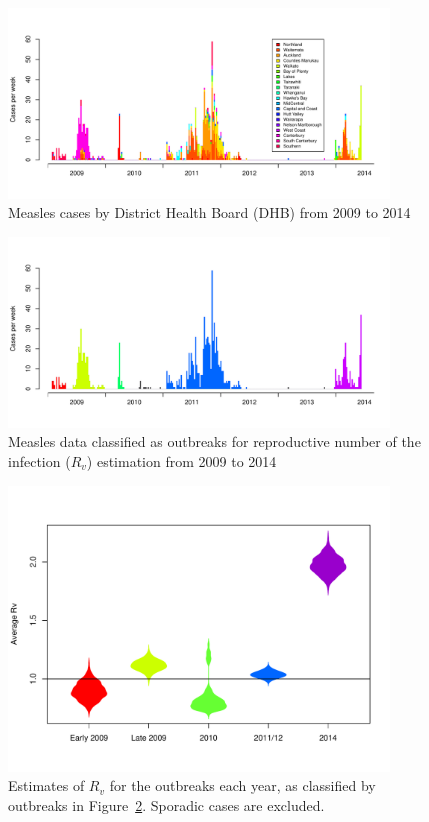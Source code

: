 \documentclass{article}
\begin{document}
\begin{itemize}
\begin{figure}
     \centering
     \includegraphics[width=0.9\textwidth]{cases_by_dhb_2009_2014.pdf}
     \caption{Measles cases by District Health Board (DHB) from 2009 to 2014}
     \label{fig:dhbcases}
\end{figure}

\begin{figure}
     \centering
     \includegraphics[width=0.9\textwidth]{outbreaks_for_R0.pdf}
     \caption{Measles data classified as outbreaks for reproductive number of the infection ($R_v$) estimation from 2009 to 2014}
     \label{fig:outbreaks}
\end{figure}

\begin{figure}
     \centering
     \includegraphics[width=0.9\textwidth]{averageR0.pdf}
     \caption{Estimates of $R_v$ for the outbreaks each year, as classified by outbreaks in Figure~\ref{fig:outbreaks}. Sporadic cases are excluded.}
     \label{fig:r0}
\end{figure}


\end{itemize}
\end{document}
